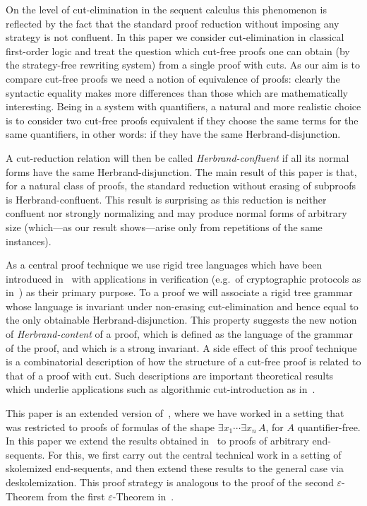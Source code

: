 \documentclass{LMCS}
\theoremstyle{plain}
\theoremstyle{definition}
\begin{document}
On the level of cut-elimination in the sequent calculus this
phenomenon is reflected by the fact that the standard proof reduction
without imposing any strategy is not confluent.  In this paper we
consider cut-elimination in classical first-order logic and treat the
question which cut-free proofs one can obtain (by the strategy-free
rewriting system) from a single proof with cuts. As our aim is to
compare cut-free proofs we need a notion of equivalence of proofs:
clearly the syntactic equality makes more differences than those which
are mathematically interesting. Being in a system with quantifiers, a
natural and more realistic choice is to consider two cut-free proofs
equivalent if they choose the same terms for the same quantifiers, in
other words: if they have the same Herbrand-disjunction.

A cut-reduction relation will then be called {\em Herbrand-confluent}
if all its normal forms have the same Herbrand-disjunction. The main
result of this paper is that, for a natural class of proofs, the
standard reduction without erasing of subproofs is
Herbrand-confluent. This result is surprising as this reduction is
neither confluent nor strongly normalizing and may produce normal
forms of arbitrary size (which---as our result shows---arise only
from repetitions of the same instances).

As a central proof technique we use rigid tree languages which have
been introduced in~\cite{Jacquemard09Rigid} with applications in
verification (e.g.\ of cryptographic protocols as
in~\cite{Jacquemard11Rigid}) as their primary purpose. To a proof we
will associate a rigid tree grammar whose language is invariant under
non-erasing cut-elimination and hence equal to the only obtainable
Herbrand-disjunction. This property suggests the new notion of
\emph{Herbrand-content} of a proof, which is defined as the language of the
grammar of the proof, and which is a strong invariant.  A side effect of this
proof technique is a combinatorial description of how the structure of
a cut-free proof is related to that of a proof with cut. Such
descriptions are important theoretical results which underlie
applications such as algorithmic cut-introduction as
in~\cite{Hetzl12Towards,HetzlXXAlgorithmic}.

This paper is an extended version of~\cite{Hetzl12Herbrand}, where we
have worked in a setting that was restricted to proofs of formulas of
the shape $\exists x_1 \cdots \exists x_n\, A$, for $A$
quantifier-free. In this paper we extend the results obtained
in~\cite{Hetzl12Herbrand} to proofs of arbitrary end-sequents. For
this, we first carry out the central technical work in a setting of
skolemized end-sequents, and then extend these results to the general
case via deskolemization. This proof strategy is analogous to the proof of
the second $\varepsilon$-Theorem from the first $\varepsilon$-Theorem
in~\cite{Hilbert39Grundlagen2}.  
\end{document}
